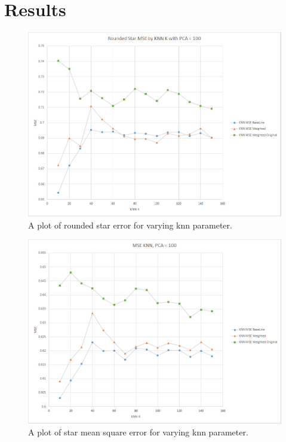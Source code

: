 \documentclass[10pt,twocolumn,letterpaper]{article}
\begin{document}

\section{Results}

\begin{figure}[t]
\begin{center}
   \includegraphics[width=0.9\linewidth]{knnErr.png}
\end{center}
   \caption{A plot of rounded star error for varying knn parameter.}
\label{fig:knnErr}
\end{figure}

\begin{figure}[t]
\begin{center}
   \includegraphics[width=0.9\linewidth]{knnMSE.png}
\end{center}
   \caption{A plot of star mean square error for varying knn parameter.}
\label{fig:knnMSE}
\end{figure}
\end{document}
